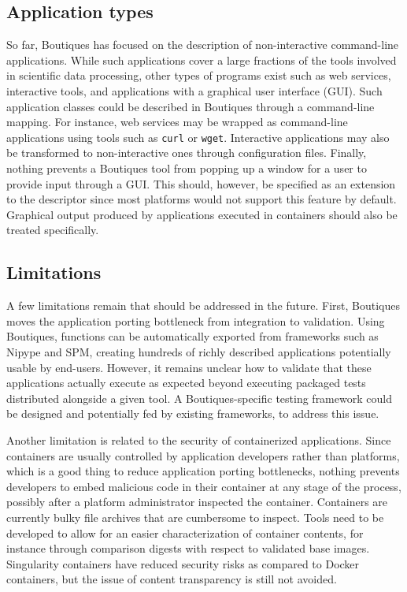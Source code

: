 \documentclass[a4paper,num-refs]{oup-contemporary}
\newcommand{\boutiques}{Boutiques\xspace}
\begin{document}
\subsection{Application types}

So far, \boutiques has focused on the description of non-interactive
command-line applications. While such applications cover a large
fractions of the tools involved in scientific data processing, other
types of programs exist such as web services, interactive tools, and
applications with a graphical user interface (GUI).  Such application
classes could be described in \boutiques through a command-line
mapping. For instance, web services may be wrapped as command-line
applications using tools such as \texttt{curl} or
\texttt{wget}. Interactive applications may also be transformed to
non-interactive ones through configuration files. Finally, nothing
prevents a \boutiques tool from popping up a window for a user to
provide input through a GUI. This should, however, be specified
as an extension to the descriptor since most platforms would not support
this feature by default. Graphical output produced by applications
executed in containers should also be treated specifically.

\subsection{Limitations}

A few limitations remain that should be addressed in the
future. First, \boutiques moves the application porting bottleneck
from integration to validation. Using \boutiques, functions can be
automatically exported from frameworks such as Nipype and SPM,
creating hundreds of richly described applications potentially usable
by end-users. However, it remains unclear how to validate that these
applications actually execute as expected beyond executing packaged tests
distributed alongside a given tool. A \boutiques-specific testing
framework could be designed and potentially fed by existing frameworks,
to address this issue.

Another limitation is related to the security of containerized
applications. Since containers are usually controlled by application
developers rather than platforms, which is a good thing to reduce
application porting bottlenecks, nothing prevents developers to embed
malicious code in their container at any stage of the process,
possibly after a platform administrator inspected the
container. Containers are currently bulky file archives that are
cumbersome to inspect. Tools need to be developed to allow for an
easier characterization of container contents, for instance through
comparison digests with respect to validated base images. Singularity
containers have reduced security risks as compared to Docker containers,
but the issue of content transparency is still not avoided.
\end{document}
